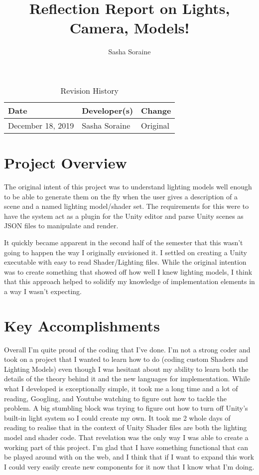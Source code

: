 \documentclass{article}
\title{Reflection Report on Lights, Camera, Models!}
\author{Sasha Soraine}
\date{}
\begin{document}
\begin{table}[hp]
\caption{Revision History} \label{TblRevisionHistory}
\begin{tabularx}{\textwidth}{llX}
\toprule
\textbf{Date} & \textbf{Developer(s)} & \textbf{Change}\\
\midrule
December 18, 2019 & Sasha Soraine & Original\\
\bottomrule
\end{tabularx}
\end{table}

\newpage

\maketitle

\section{Project Overview}

The original intent of this project was to understand lighting models well 
enough to be able to generate them on the fly when the user gives a description 
of a scene and a named lighting model/shader set. The requirements for this 
were to have the system act as a plugin for the Unity editor and parse Unity 
scenes as JSON files to manipulate and render.

It quickly became apparent in the second half of the semester that this wasn't 
going to happen the way I originally envisioned it. I settled on creating a 
Unity executable with easy to read Shader/Lighting files. While the original 
intention was to create something that showed off how well I knew lighting 
models, I think that this approach helped to solidify my knowledge of 
implementation elements in a way I wasn't expecting.

\section{Key Accomplishments}
Overall I'm quite proud of the coding that I've done. I'm not a strong coder 
and took on a project that I wanted to learn how to do (coding custom Shaders 
and Lighting Models) even though I was hesitant about my ability to learn both 
the details of the theory behind it and the new languages for implementation. 
While what I developed is exceptionally simple, it took me a long time and a 
lot of reading, Googling, and Youtube watching to figure out how to tackle the 
problem. A big stumbling block was trying to figure out how to turn off Unity's 
built-in light system so I could create my own. It took me 2 whole days of 
reading to realise that in the context of Unity Shader files are both the 
lighting model and shader code. That revelation was the only way I was able to 
create a working part of this project. I'm glad that I have something 
functional that can be played around with on the web, and I think that if I 
want to expand this work I could very easily create new components for it now 
that I know what I'm doing.
\end{document}
